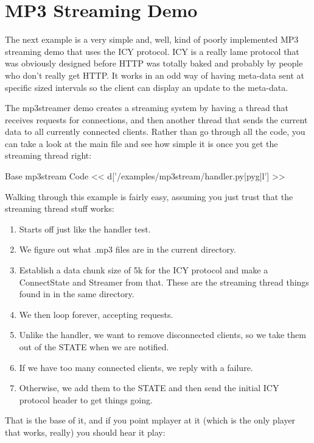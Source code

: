 \section{MP3 Streaming Demo}

The next example is a very simple and, well, kind of poorly implemented
MP3 streaming demo that uses the ICY protocol.  ICY is a really lame
protocol that was obviously designed before HTTP was totally baked
and probably by people who don't really get HTTP\@.  It works in an odd
way of having meta-data sent at specific sized intervals so the
client can display an update to the meta-data.

The mp3streamer demo creates a streaming system by
having a thread that receives requests for connections, and then
another thread that sends the current data to all currently connected
clients.  Rather than go through all the code, you can take a look
at the main file and see how simple it is once you get the
streaming thread right:

\begin{code}{Base mp3stream Code}
<< d['/examples/mp3stream/handler.py|pyg|l'] >>
\end{code}

Walking through this example is fairly easy, assuming you just trust
that the streaming thread stuff works:

\begin{enumerate}
\item Starts off just like the handler test.
\item We figure out what .mp3 files are in the current directory.
\item Establish a data chunk size of 5k for the ICY protocol and
    make a ConnectState and Streamer from that.  These are the
    streaming thread things found in  in the same
    directory.
\item We then loop forever, accepting requests.
\item Unlike the handler, we want to remove disconnected clients,
    so we take them out of the STATE when we are notified.
\item If we have too many connected clients, we reply with a failure.
\item Otherwise, we add them to the STATE and then send the initial
    ICY protocol header to get things going.
\end{enumerate}


That is the base of it, and if you point mplayer at it (which is
the only player that works, really) you should hear it play:

